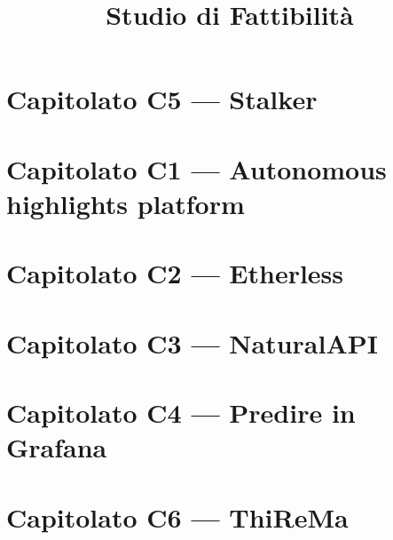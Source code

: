 \documentclass{article}
\title{Studio di Fattibilità}
\begin{document}


\section{Capitolato C5 --- Stalker}


\newpage
\section{Capitolato C1 --- Autonomous highlights platform}


\newpage
\section{Capitolato C2 --- Etherless}


\newpage
\section{Capitolato C3 --- NaturalAPI}


\newpage
\section{Capitolato C4 --- Predire in Grafana}


\newpage
\section{Capitolato C6 --- ThiReMa}

\end{document}

